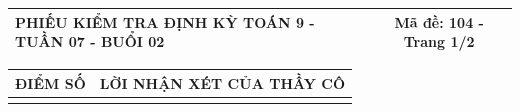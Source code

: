 \documentclass[12pt,a4paper]{article}
\begin{document}
\newpage

\noindent
\begin{tabularx}{\linewidth}{|X|c|}
\hline
\textbf{PHIẾU KIỂM TRA ĐỊNH KỲ TOÁN 9 - TUẦN 07 - BUỔI 02} & \textbf{Mã đề: 104 - Trang 1/2} \\
\hline
\end{tabularx}

\vspace{1.0mm}

\noindent
\begin{tabularx}{\linewidth}{|p{3.2cm}|X|}
\hline
\centering\textbf{ĐIỂM SỐ} & \centering\textbf{LỜI NHẬN XÉT CỦA THẦY CÔ} \tabularnewline
\hline
\rule{0pt}{1.8cm} & \tabularnewline
\hline
\end{tabularx}
\end{document}
